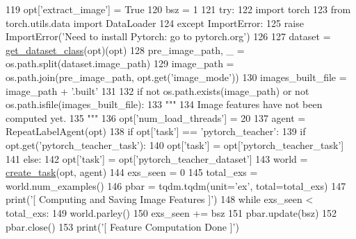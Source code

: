 \begin{DoxyCode}
119         opt[\textcolor{stringliteral}{'extract\_image'}] = \textcolor{keyword}{True}
120         bsz = 1
121         \textcolor{keywordflow}{try}:
122             \textcolor{keyword}{import} torch
123             \textcolor{keyword}{from} torch.utils.data \textcolor{keyword}{import} DataLoader
124         \textcolor{keywordflow}{except} ImportError:
125             \textcolor{keywordflow}{raise} ImportError(\textcolor{stringliteral}{'Need to install Pytorch: go to pytorch.org'})
126 
127         dataset = \hyperlink{namespaceparlai_1_1scripts_1_1extract__image__feature_a4fa5d8aef45056034f4898531a0f9967}{get\_dataset\_class}(opt)(opt)
128         pre\_image\_path, \_ = os.path.split(dataset.image\_path)
129         image\_path = os.path.join(pre\_image\_path, opt.get(\textcolor{stringliteral}{'image\_mode'}))
130         images\_built\_file = image\_path + \textcolor{stringliteral}{'.built'}
131 
132         \textcolor{keywordflow}{if} \textcolor{keywordflow}{not} os.path.exists(image\_path) \textcolor{keywordflow}{or} \textcolor{keywordflow}{not} os.path.isfile(images\_built\_file):
133             \textcolor{stringliteral}{"""}
134 \textcolor{stringliteral}{            Image features have not been computed yet.}
135 \textcolor{stringliteral}{            """}
136             opt[\textcolor{stringliteral}{'num\_load\_threads'}] = 20
137             agent = RepeatLabelAgent(opt)
138             \textcolor{keywordflow}{if} opt[\textcolor{stringliteral}{'task'}] == \textcolor{stringliteral}{'pytorch\_teacher'}:
139                 \textcolor{keywordflow}{if} opt.get(\textcolor{stringliteral}{'pytorch\_teacher\_task'}):
140                     opt[\textcolor{stringliteral}{'task'}] = opt[\textcolor{stringliteral}{'pytorch\_teacher\_task'}]
141                 \textcolor{keywordflow}{else}:
142                     opt[\textcolor{stringliteral}{'task'}] = opt[\textcolor{stringliteral}{'pytorch\_teacher\_dataset'}]
143             world = \hyperlink{namespaceparlai_1_1core_1_1worlds_a11923c10b545c7ecc1b08fe2242d9c2c}{create\_task}(opt, agent)
144             exs\_seen = 0
145             total\_exs = world.num\_examples()
146             pbar = tqdm.tqdm(unit=\textcolor{stringliteral}{'ex'}, total=total\_exs)
147             print(\textcolor{stringliteral}{'[ Computing and Saving Image Features ]'})
148             \textcolor{keywordflow}{while} exs\_seen < total\_exs:
149                 world.parley()
150                 exs\_seen += bsz
151                 pbar.update(bsz)
152             pbar.close()
153             print(\textcolor{stringliteral}{'[ Feature Computation Done ]'})

\end{DoxyCode}
